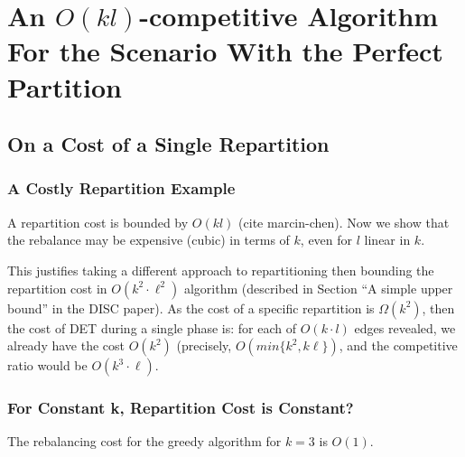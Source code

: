 
\section{An $O(kl)$-competitive Algorithm For the Scenario With the Perfect Partition}

\subsection{On a Cost of a Single Repartition}


\subsubsection{A Costly Repartition Example}

A repartition cost is bounded by $O(kl)$ (cite marcin-chen).
Now we show that the rebalance may be expensive (cubic) in terms of $k$, even for $l$ linear in $k$.

This justifies taking a different approach to repartitioning then bounding the repartition cost in $O(k^2\cdot \ell^2)$ algorithm (described in Section ``A simple upper bound'' in the DISC paper).
As the cost of a specific repartition is $\Omega(k^2)$, then the cost of DET during a single phase is: for each of $O(k \cdot l)$ edges revealed, we already have the cost $O(k^2)$ (precisely, $O(min\{k^2, k\ell\})$, and the competitive ratio would be $O(k^3\cdot \ell)$. 


\subsubsection{For Constant k, Repartition Cost is Constant?}


\begin{theorem}
  The rebalancing cost for the greedy algorithm for $k=3$ is $O(1)$.
  \label{rebalancing-cost}
\end{theorem}

